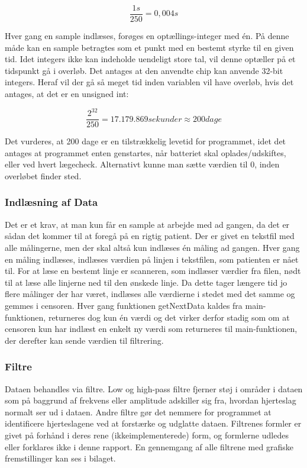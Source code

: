 \documentclass{article}
\begin{document}
\begin{equation} 
\frac{1s}{250} = 0,004s
\end{equation}

Hver gang en sample indlæses, forøges en optællings-integer med én. På denne måde kan en sample betragtes som et punkt med en bestemt styrke til en given tid. Idet integers ikke kan indeholde uendeligt store tal, vil denne optæller på et tidspunkt gå i overløb. Det antages at den anvendte chip kan anvende 32-bit integers. Heraf vil der gå så meget tid inden variablen vil have overløb, hvis det antages, at det er en unsigned int:

\begin{equation}
\frac{2^{32}}{250} = 17.179.869 sekunder \approx 200 dage
\end{equation}

Det vurderes, at 200 dage er en tilstrækkelig levetid for programmet, idet det antages at programmet enten genstartes, når batteriet skal oplades/udskiftes, eller ved hvert lægecheck. Alternativt kunne man sætte værdien til 0, inden overløbet finder sted.

\subsubsection{Indlæsning af Data}
Det er et krav, at man kun får en sample at arbejde med ad gangen, da det er sådan det kommer til at foregå på en rigtig patient. Der er givet en tekstfil med alle målingerne, men der skal altså kun indlæses én måling ad gangen. Hver gang en måling indlæses, indlæses værdien på linjen i tekstfilen, som patienten er nået til. For at læse en bestemt linje er scanneren, som indlæser værdier fra filen, nødt til at læse alle linjerne ned til den ønskede linje. Da dette tager længere tid jo flere målinger der har været, indlæses alle værdierne i stedet med det samme og gemmes i censoren. Hver gang funktionen getNextData kaldes fra main-funktionen, returneres dog kun én værdi og det virker derfor stadig som om at censoren kun har indlæst en enkelt ny værdi som returneres til main-funktionen, der derefter kan sende værdien til filtrering.

\subsubsection{Filtre}
Dataen behandles via filtre. Low og high-pass filtre fjerner støj i områder i dataen som på baggrund af frekvens eller amplitude adskiller sig fra, hvordan hjerteslag normalt ser ud i dataen. Andre filtre gør det nemmere for programmet at identificere hjerteslagene ved at forstærke og udglatte dataen. Filtrenes formler er givet på forhånd i deres rene (ikkeimplementerede) form, og formlerne udledes eller forklares ikke i denne rapport. En gennemgang af alle filtrene med grafiske fremstillinger kan ses i bilaget.
\end{document}
